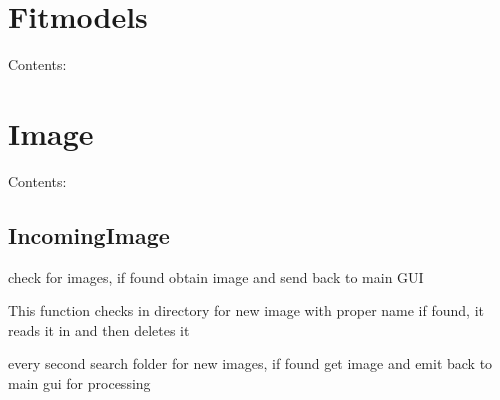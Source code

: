\documentclass[letterpaper,10pt,english]{sphinxmanual}
\begin{document}
\begin{fulllineitems}
\label{PlotGrid:Dataplots.PlotGrid}
\end{fulllineitems}



\chapter{Fitmodels}
\label{Fitmodels:fitmodels}\label{Fitmodels::doc}
Contents:


\chapter{Image}
\label{Image:image}\label{Image::doc}
Contents:


\section{IncomingImage}
\label{IncomingImage::doc}\label{IncomingImage:incomingimage}

\begin{fulllineitems}
\label{IncomingImage:Image.IncomingImage}
check for images, if found obtain image and send back to main GUI

\begin{fulllineitems}
\label{IncomingImage:Image.IncomingImage.newImage}
This function checks in directory for new image with proper name
if found, it reads it in and then deletes it

\end{fulllineitems}


\begin{fulllineitems}
\label{IncomingImage:Image.IncomingImage.run}
every second search folder for new images, if found
get image and emit back to main gui for processing

\end{fulllineitems}


\end{fulllineitems}
\end{document}
